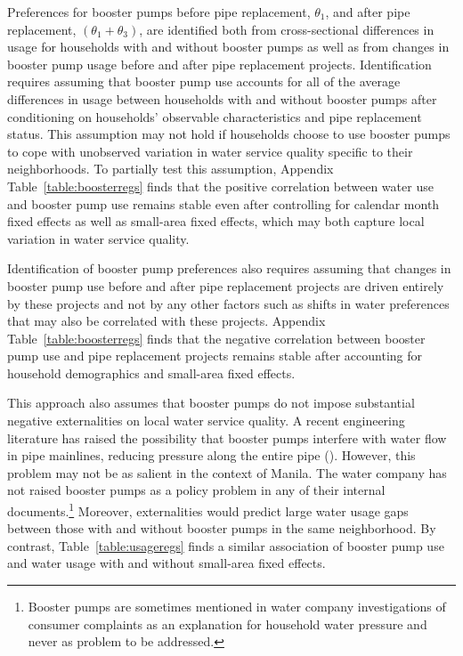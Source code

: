 \documentclass[12pt,table]{article}
\begin{document}
Preferences for booster pumps before pipe replacement, $\theta_1$, and after pipe replacement, $(\theta_1+\theta_3)$, are identified both from cross-sectional differences in usage for households with and without booster pumps as well as from changes in booster pump usage before and after pipe replacement projects.  Identification requires assuming that booster pump use accounts for all of the average differences in usage between households with and without booster pumps after conditioning on households' observable characteristics and pipe replacement status.  This assumption may not hold if households choose to use booster pumps to cope with unobserved variation in water service quality specific to their neighborhoods.  To partially test this assumption, Appendix Table~\ref{table:boosterregs} finds that the positive correlation between water use and booster pump use remains stable even after controlling for calendar month fixed effects as well as small-area fixed effects, which may both capture local variation in water service quality.

Identification of booster pump preferences also requires assuming that changes in booster pump use before and after pipe replacement projects are driven entirely by these projects and not by any other factors such as shifts in water preferences that may also be correlated with these projects.  Appendix Table~\ref{table:boosterregs} finds that the negative correlation between booster pump use and pipe replacement projects remains stable after accounting for household demographics and small-area fixed effects.  

This approach also assumes that booster pumps do not impose substantial negative externalities on local water service quality.  A recent engineering literature has raised the possibility that booster pumps interfere with water flow in pipe mainlines, reducing pressure along the entire pipe (\cite{taylor2014reducing}).  However, this problem may not be as salient in the context of Manila.  The water company has not raised booster pumps as a policy problem in any of their internal documents.\footnote{Booster pumps are sometimes mentioned in water company investigations of consumer complaints as an explanation for household water pressure and never as problem to be addressed.}  Moreover, externalities would predict large water usage gaps between those with and without booster pumps in the same neighborhood.  By contrast, Table~\ref{table:usageregs} finds a similar association of booster pump use and water usage with and without small-area fixed effects.   %
\end{document}
